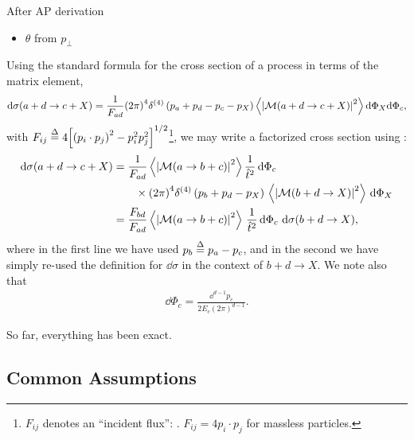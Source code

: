 \begin{subappendices}
\begin{itemize}
\end{itemize}

\begin{sambox}{After AP derivation}{}
    \begin{itemize}
        \item
            \(\theta\) from \(p_\perp\)
    \end{itemize}
\end{sambox}


Using the standard formula for the cross section of a process in terms of the matrix element,
\begin{align}
    \dd\sigma(a + d \to c + X)
    =
    \frac{1}{F_{ad}}
    {(2\pi)}^4 \delta^{(4)}\left(p_a + p_d - p_c - p_X\right)
    \left\langle
        \left| \mathcal{M}(a + d \to c + X) \right|^2
    \right \rangle
    \dd\Phi_X
    \dd\Phi_c
    ,
\end{align}
with \(F_{ij} \overset{\Delta}{=} 4{\left[{\left( p_i \cdot p_j \right)}^2 - p_i^2 p_j^2 \right]}^{1/2}\)\footnote{
    \(F_{ij}\) denotes an ``incident flux'': . \(F_{ij} = 4 p_i \cdot p_j\) for massless particles.
}, we may write a factorized cross section using :
\begin{align}
    \dd\sigma(a + d \to c + X)
    &=
    \frac{1}{F_{ad}}
    \le \langle
        \le| \mathcal{M}(a \to b + c) \ri|^2
    \ri \rangle
    \frac{1}{\hat{t}^2}
    \,
    \dd\Phi_c
    \\&
    \notag
    \qquad
    \times
    {(2\pi)}^4 \dfour{p_b + p_d - p_X}
    \,
    \le \langle
        \le| \mathcal{M}(b + d \to X) \ri|^2
    \ri\rangle
    \,
    \dd\Phi_X
    \\
    &=
    \frac{F_{bd}}{F_{ad}}
    \le \langle
        \le| \mathcal{M}(a \to b + c) \ri|^2
    \ri \rangle
    \,
    \frac{1}{\hat{t}^2}
    \,
    \dd\Phi_c
    \,\,
    \dd\sigma(b + d \to X)
    \label{eq:factorized_cross_section_2}
    ,
\end{align}
where in the first line we have used \(p_b \overset{\Delta}{=} p_a - p_c\), and in the second we have simply re-used the definition for \(\dd\sigma\) in the context of \(b + d \to X\).
%
We note also that
\begin{align}
    \dd\Phi_c = \frac{\dd^{d-1} p_c}{2 E_c {(2\pi)}^{d-1}}
    .
\end{align}

So far, everything has been exact.

\subsection{Common Assumptions}


\end{subappendices}
